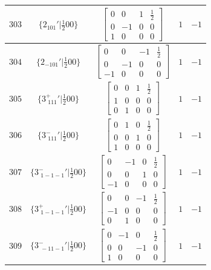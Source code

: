 \documentclass[fleqn,8pt]{jsarticle}
\begin{document}
\begin{longtable}{ccccc}
$ 303 $ & $ \{2{}_{101}{}'|\frac{1}{2} 0 0\} $ & $ \begin{bmatrix} 0 & 0 & 1 & \frac{1}{2} \\ 0 & -1 & 0 & 0 \\ 1 & 0 & 0 & 0 \end{bmatrix} $ & $ 1 $ & $ -1 $ \\ \hline
$ 304 $ & $ \{2{}_{-101}{}'|\frac{1}{2} 0 0\} $ & $ \begin{bmatrix} 0 & 0 & -1 & \frac{1}{2} \\ 0 & -1 & 0 & 0 \\ -1 & 0 & 0 & 0 \end{bmatrix} $ & $ 1 $ & $ -1 $ \\ \hline
$ 305 $ & $ \{3^{+}_{\,\,111}{}'|\frac{1}{2} 0 0\} $ & $ \begin{bmatrix} 0 & 0 & 1 & \frac{1}{2} \\ 1 & 0 & 0 & 0 \\ 0 & 1 & 0 & 0 \end{bmatrix} $ & $ 1 $ & $ -1 $ \\ \hline
$ 306 $ & $ \{3^{-}_{\,\,111}{}'|\frac{1}{2} 0 0\} $ & $ \begin{bmatrix} 0 & 1 & 0 & \frac{1}{2} \\ 0 & 0 & 1 & 0 \\ 1 & 0 & 0 & 0 \end{bmatrix} $ & $ 1 $ & $ -1 $ \\ \hline
$ 307 $ & $ \{3^{-}_{\,\,1-1-1}{}'|\frac{1}{2} 0 0\} $ & $ \begin{bmatrix} 0 & -1 & 0 & \frac{1}{2} \\ 0 & 0 & 1 & 0 \\ -1 & 0 & 0 & 0 \end{bmatrix} $ & $ 1 $ & $ -1 $ \\ \hline
$ 308 $ & $ \{3^{+}_{\,\,1-1-1}{}'|\frac{1}{2} 0 0\} $ & $ \begin{bmatrix} 0 & 0 & -1 & \frac{1}{2} \\ -1 & 0 & 0 & 0 \\ 0 & 1 & 0 & 0 \end{bmatrix} $ & $ 1 $ & $ -1 $ \\ \hline
$ 309 $ & $ \{3^{-}_{\,\,-11-1}{}'|\frac{1}{2} 0 0\} $ & $ \begin{bmatrix} 0 & -1 & 0 & \frac{1}{2} \\ 0 & 0 & -1 & 0 \\ 1 & 0 & 0 & 0 \end{bmatrix} $ & $ 1 $ & $ -1 $ \\ \hline

\end{longtable}
\end{document}
